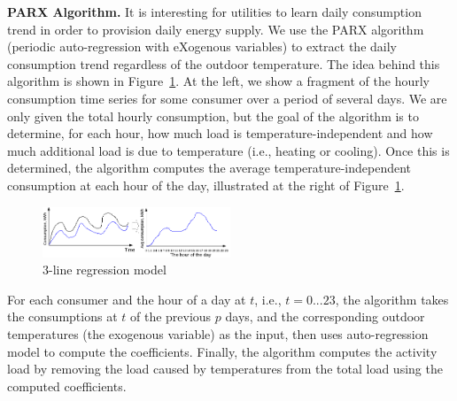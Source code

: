 \documentclass{sig-alternate}
\newcommand{\ie}{i.e.}
\begin{document}
{\bf PARX Algorithm.} It is interesting for utilities to learn  daily consumption trend in order to provision daily energy supply. We use the PARX algorithm (periodic auto-regression with eXogenous variables) \cite{omid} to extract the daily consumption trend regardless of the outdoor temperature. 
 The idea behind this algorithm is shown in Figure~\ref{fig:dailyprofile}. At the left, we show a fragment of the hourly consumption time series for some consumer over a period of several days. We are only given the total hourly consumption, but the goal of the algorithm is to determine, for each hour, how much load is temperature-independent and how much additional load is due to temperature (i.e., heating or cooling). Once this is determined, the algorithm computes the average temperature-independent consumption at each hour of the day, illustrated at the right of Figure~\ref{fig:dailyprofile}.
\begin{figure}[htp]
\vspace{-10pt}
\centering
\includegraphics[width=0.5\textwidth]{images/dailyprofile}
\vspace{-20pt}
\caption{3-line regression model}
\label{fig:dailyprofile}
\vspace{-10pt}
\end{figure}

For each consumer and the hour of a day at $t$, \ie, $t=0...23$, the algorithm takes the consumptions at $t$ of the previous $p$ days, and the corresponding outdoor temperatures (the exogenous variable) as the input, then uses auto-regression model to compute the coefficients. Finally, the algorithm computes the activity load by removing the load caused by temperatures from the total load  using the computed coefficients.
\end{document}
